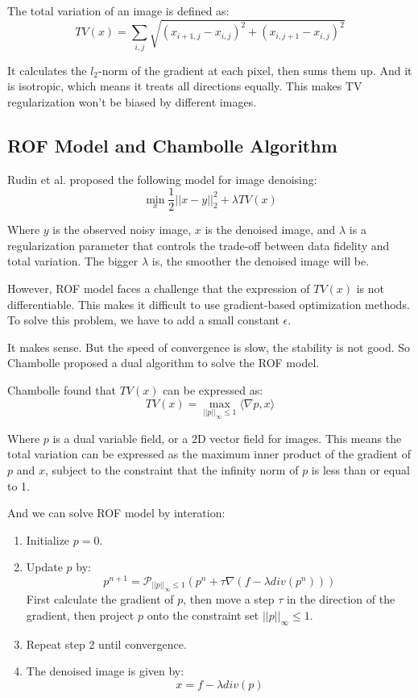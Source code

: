 \documentclass[10pt,a4paper,oneside,numbers=noenddot]{scrbook}
\theoremstyle{ctplain}
\theoremstyle{ctresult}
\begin{document}
The total variation of an image is defined as:
\[
  TV(x) = \sum_{i,j} \sqrt{(x_{i+1,j} - x_{i,j})^2 + (x_{i,j+1} - x_{i,j})^2}
\]

It calculates the $l_2$-norm of the gradient at each pixel, then sums them up. And
it is isotropic, which means it treats all directions equally. This makes TV
regularization won't be biased by different images.

\subsection{ROF Model and Chambolle Algorithm}

Rudin et al. proposed the following model for image denoising:
\[
  \min_x \frac{1}{2} ||x - y||_2^2 + \lambda TV(x)
\]

Where $y$ is the observed noisy image, $x$ is the denoised image, and $\lambda$ is
a regularization parameter that controls the trade-off between data fidelity and
total variation. The bigger $\lambda$ is, the smoother the denoised image will be.

However, ROF model faces a challenge that the expression of $TV(x)$ is not
differentiable. This makes it difficult to use gradient-based optimization
methods. To solve this problem, we have to add a small constant $\epsilon$.

It makes sense. But the speed of convergence is slow, the stability is not good. So
Chambolle proposed a dual algorithm to solve the ROF model.

Chambolle found that $TV(x)$ can be expressed as:
\[
  TV(x) = \max_{||p||_\infty \leq 1} \langle \nabla p, x \rangle
\]

Where $p$ is a dual variable field, or a 2D vector field for images. This means
the total variation can be expressed as the maximum inner product of the gradient
of $p$ and $x$, subject to the constraint that the infinity norm of $p$ is less
than or equal to 1.

And we can solve ROF model by interation:
\begin{enumerate}
  \item Initialize $p = 0$.
  \item Update $p$ by:
  \[
    p^{n+1} = \mathcal{P}_{||p||_\infty \leq 1}(p^{n} + \tau \nabla (f - \lambda div(p^n)))
  \]
  First calculate the gradient of $p$, then move a step $\tau$ in the direction of
  the gradient, then project $p$ onto the constraint set $||p||_\infty \leq 1$.
  \item Repeat step 2 until convergence.
  \item The denoised image is given by:
  \[
    x = f - \lambda div(p)
  \]
\end{enumerate}
\end{document}
